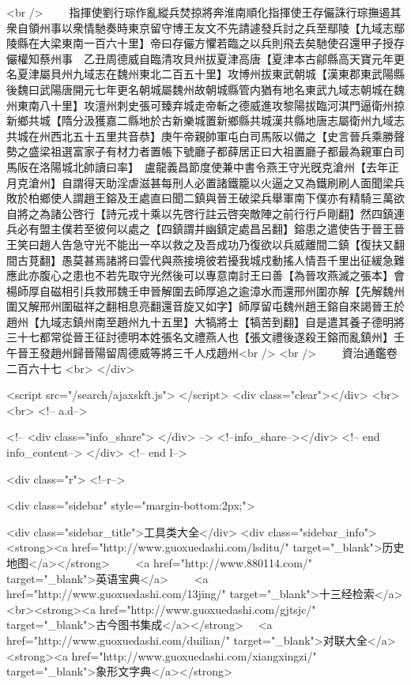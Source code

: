<br />
　　指揮使劉行琮作亂縱兵焚掠將奔淮南順化指揮使王存儼誅行琮撫遏其衆自領州事以衆情馳奏時東京留守博王友文不先請遽發兵討之兵至鄢陵【九域志鄢陵縣在大梁東南一百六十里】帝曰存儼方懼若臨之以兵則飛去矣馳使召還甲子授存儼權知蔡州事　乙丑周德威自臨清攻貝州拔夏津高唐【夏津本古鄃縣高天寶元年更名夏津屬貝州九域志在魏州東北二百五十里】攻博州拔東武朝城【漢東郡東武陽縣後魏曰武陽唐開元七年更名朝城屬魏州故朝城縣管内猶有地名東武九域志朝城在魏州東南八十里】攻澶州刺史張可臻弃城走帝斬之德威進攻黎陽拔臨河淇門逼衛州掠新鄉共城【隋分汲獲嘉二縣地於古新樂城置新鄉縣共城漢共縣地唐志屬衛州九域志共城在州西北五十五里共音恭】庚午帝親帥軍屯白司馬阪以備之【史言晉兵乘勝聲勢之盛梁祖選富家子有材力者置帳下號廳子都薛居正曰大祖置廳子都最為親軍白司馬阪在洛陽城北帥讀曰率】　盧龍義昌節度使兼中書令燕王守光旣克滄州【去年正月克滄州】自謂得天助淫虐滋甚每刑人必置諸鐵籠以火逼之又為鐵刷刷人面聞梁兵敗於柏鄉使人謂趙王鎔及王處直曰聞二鎮與晉王破梁兵舉軍南下僕亦有精騎三萬欲自將之為諸公啓行【詩元戎十乘以先啓行註云啓突敵陣之前行行戶剛翻】然四鎮連兵必有盟主僕若至彼何以處之【四鎮謂并幽鎮定處昌呂翻】鎔患之遣使告于晉王晉王笑曰趙人告急守光不能出一卒以救之及吾成功乃復欲以兵威離間二鎮【復扶又翻間古莧翻】愚莫甚焉諸將曰雲代與燕接境彼若擾我城戍動搖人情吾千里出征緩急難應此亦腹心之患也不若先取守光然後可以專意南討王曰善【為晉攻燕滅之張本】會楊師厚自磁相引兵救邢魏壬申晉解圍去師厚追之逾漳水而還邢州圍亦解【先解魏州圍又解邢州圍磁祥之翻相息亮翻還音旋又如字】師厚留屯魏州趙王鎔自來謁晉王於趙州【九域志鎮州南至趙州九十五里】大犒將士【犒苦到翻】自是遣其養子德明將三十七都常從晉王征討德明本姓張名文禮燕人也【張文禮後遂殺王鎔而亂鎮州】壬午晉王發趙州歸晉陽留周德威等將三千人戍趙州<br />
<br />
　　資治通鑑卷二百六十七  <br>
   </div> 

<script src="/search/ajaxskft.js"> </script>
 <div class="clear"></div>
<br>
<br>
 <!-- a.d-->

 <!--
<div class="info_share">
</div> 
-->
 <!--info_share--></div>   <!-- end info_content-->
  </div> <!-- end l-->

<div class="r">   <!--r-->



<div class="sidebar"  style="margin-bottom:2px;">

 
<div class="sidebar_title">工具类大全</div>
<div class="sidebar_info">
<strong><a href="http://www.guoxuedashi.com/lsditu/" target="_blank">历史地图</a></strong>　　
<a href="http://www.880114.com/" target="_blank">英语宝典</a>　　
<a href="http://www.guoxuedashi.com/13jing/" target="_blank">十三经检索</a>　
<br><strong><a href="http://www.guoxuedashi.com/gjtsjc/" target="_blank">古今图书集成</a></strong>　
<a href="http://www.guoxuedashi.com/duilian/" target="_blank">对联大全</a>　<strong><a href="http://www.guoxuedashi.com/xiangxingzi/" target="_blank">象形文字典</a></strong>　

